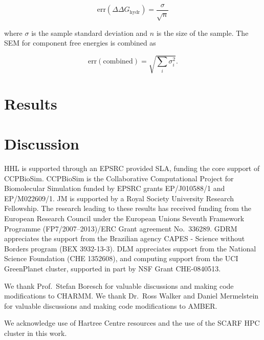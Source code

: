 \documentclass[journal=jctcce,manuscript=article]{achemso}
\begin{document}
\begin{equation}
  \label{eq:sem}
  \mathrm{err}(\Delta\Delta G_{\mathrm{hydr}}) = \frac{\sigma}{\sqrt{n}}
\end{equation}

where $\sigma$ is the sample standard deviation and $n$ is the size of
the sample.  The SEM for component free energies is combined as

\begin{equation}
  \label{eq:sem-comb}
  \mathrm{err}(\mathrm{combined}) = \sqrt{\sum_i \sigma_i^2}.
\end{equation}

\section{Results}
\label{sec:results}


\section{Discussion}
\label{sec:discuss}




\begin{acknowledgement}
  HHL is supported through an EPSRC provided SLA, funding the core
  support of CCPBioSim.  CCPBioSim is the Collaborative Computational
  Project for Biomolecular Simulation funded by EPSRC grants
  EP/J010588/1 and EP/M022609/1.  JM is supported by a Royal Society
  University Research Fellowship.  The research leading to these
  results has received funding from the European Research Council
  under the European Unions Seventh Framework Programme
  (FP7/2007--2013)/ERC Grant agreement No.\ 336289.  GDRM appreciates
  the support from the Brazilian agency CAPES - Science without
  Borders program (BEX 3932-13-3).  DLM appreciates support from the
  National Science Foundation (CHE 1352608), and computing support
  from the UCI GreenPlanet cluster, supported in part by NSF Grant
  CHE-0840513.

  We thank Prof.\ Stefan Boresch for valuable discussions and making
  code modifications to CHARMM.  We thank Dr.\ Ross Walker and Daniel
  Mermelstein for valuable discussions and making code modifications
  to AMBER.

  We acknowledge use of Hartree Centre resources and the use of the
  SCARF HPC cluster in this work.
\end{acknowledgement}



\end{document}
